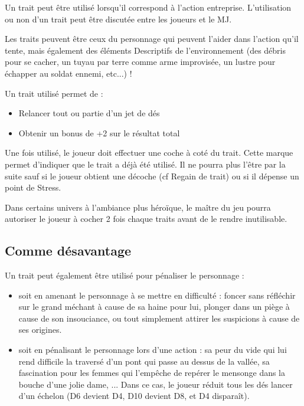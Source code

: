 Un trait peut être utilisé lorsqu'il correspond à l'action entreprise. L'utilisation ou non d'un trait peut être discutée entre les joueurs et le MJ.

Les traits peuvent être ceux du personnage qui peuvent l'aider dans l'action qu'il tente, mais également des éléments Descriptifs de l'environnement (des débris pour se cacher, un tuyau par terre comme arme improvisée, un lustre pour échapper au soldat ennemi, etc...) !


Un trait utilisé permet de :

\begin{itemize}
\item Relancer tout ou partie d'un jet de dés
\item Obtenir un bonus de +2 sur le résultat total
\end{itemize}

Une fois utilisé, le joueur doit effectuer une coche à coté du trait. Cette marque permet d'indiquer que le trait a déjà été utilisé. Il ne pourra plus l'être par la suite sauf si le joueur obtient une décoche (cf Regain de trait) ou si il dépense un point de Stress.

Dans certains univers à l'ambiance plus héroïque, le maître du jeu pourra autoriser le joueur à cocher 2 fois chaque traits avant de le rendre inutilisable.

\subsection{Comme désavantage}

Un trait peut également être utilisé pour pénaliser le personnage : 

\begin{itemize}
\item soit en amenant le personnage à se mettre en difficulté : foncer sans réfléchir sur le grand méchant à cause de sa haine pour lui, plonger dans un piège à cause de son insouciance, ou tout simplement attirer les suspicions à cause de ses origines.
\item soit en pénalisant le personnage lors d'une action : sa peur du vide qui lui rend difficile la traversé d'un pont qui passe au dessus de la vallée, sa fascination pour les femmes qui l'empêche de repérer le mensonge dans la bouche d'une jolie dame, ... Dans ce cas, le joueur réduit tous les dés lancer d'un échelon (D6 devient D4, D10 devient D8, et D4 disparaît).
\end{itemize}

